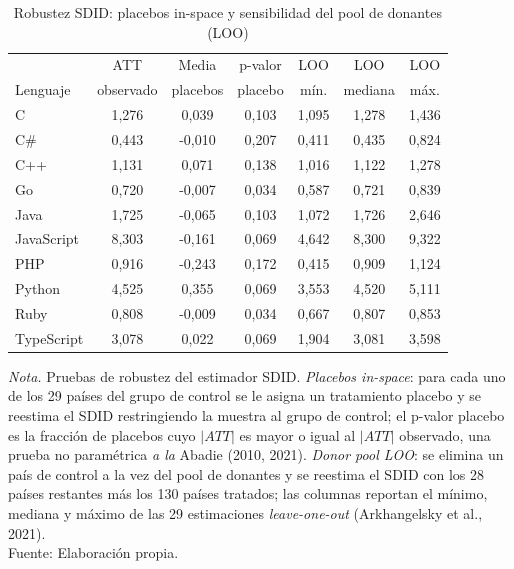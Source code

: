 \begin{table}[htbp]\centering
\caption{Robustez SDID: placebos in-space y sensibilidad del pool de donantes (LOO)}
\label{tab:tabla6}
\small
\begin{tabular}{lcccccc}
\toprule
 & ATT & Media & p-valor & LOO & LOO & LOO \\
Lenguaje & observado & placebos & placebo & m\'{i}n. & mediana & m\'{a}x. \\
\midrule
C & 1{,}276 & 0{,}039 & 0{,}103 & 1{,}095 & 1{,}278 & 1{,}436 \\
C\# & 0{,}443 & -0{,}010 & 0{,}207 & 0{,}411 & 0{,}435 & 0{,}824 \\
C++ & 1{,}131 & 0{,}071 & 0{,}138 & 1{,}016 & 1{,}122 & 1{,}278 \\
Go & 0{,}720 & -0{,}007 & 0{,}034 & 0{,}587 & 0{,}721 & 0{,}839 \\
Java & 1{,}725 & -0{,}065 & 0{,}103 & 1{,}072 & 1{,}726 & 2{,}646 \\
JavaScript & 8{,}303 & -0{,}161 & 0{,}069 & 4{,}642 & 8{,}300 & 9{,}322 \\
PHP & 0{,}916 & -0{,}243 & 0{,}172 & 0{,}415 & 0{,}909 & 1{,}124 \\
Python & 4{,}525 & 0{,}355 & 0{,}069 & 3{,}553 & 4{,}520 & 5{,}111 \\
Ruby & 0{,}808 & -0{,}009 & 0{,}034 & 0{,}667 & 0{,}807 & 0{,}853 \\
TypeScript & 3{,}078 & 0{,}022 & 0{,}069 & 1{,}904 & 3{,}081 & 3{,}598 \\
\bottomrule
\end{tabular}
\begin{minipage}{\linewidth}
\smallskip\footnotesize\textit{Nota.} Pruebas de robustez del estimador SDID. \textit{Placebos in-space}: para cada uno de los 29 pa\'{i}ses del grupo de control se le asigna un tratamiento placebo y se reestima el SDID restringiendo la muestra al grupo de control; el p-valor placebo es la fracci\'{o}n de placebos cuyo $|ATT|$ es mayor o igual al $|ATT|$ observado, una prueba no param\'{e}trica \textit{a la} Abadie (2010, 2021). \textit{Donor pool LOO}: se elimina un pa\'{i}s de control a la vez del pool de donantes y se reestima el SDID con los 28 pa\'{i}ses restantes m\'{a}s los 130 pa\'{i}ses tratados; las columnas reportan el m\'{i}nimo, mediana y m\'{a}ximo de las 29 estimaciones \textit{leave-one-out} (Arkhangelsky et al., 2021).\\[\baselineskip]Fuente: Elaboraci\'{o}n propia.
\end{minipage}
\end{table}
